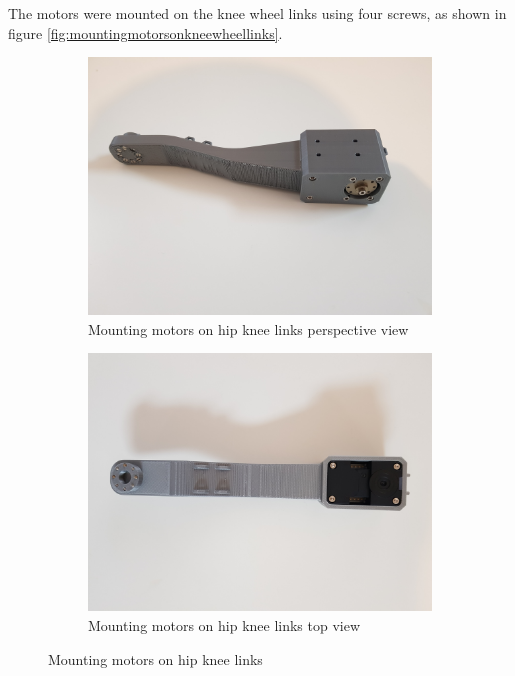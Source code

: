 The motors were mounted on the knee wheel links using four screws, as shown in figure \ref{fig:mountingmotorsonkneewheellinks}.
\begin{figure}[h]
	\centering
	\begin{subfigure}[t]{0.45\textwidth}
		\includegraphics[height=0.7\textwidth]{mounting_motors_on_hip_knee_links_1}
		\caption{Mounting motors on hip knee links perspective view}
		\label{fig:mountingmotorsonhipkneelinksperspectiveview}
	\end{subfigure}
	\begin{subfigure}[t]{0.45\textwidth}
		\includegraphics[height=0.7\textwidth]{mounting_motors_on_hip_knee_links_2}
		\caption{Mounting motors on hip knee links top view}
		\label{fig:mountingmotorsonhipkneelinkstopview}
	\end{subfigure}
	\caption{Mounting motors on hip knee links}
	\label{fig:Mounting motors on hip knee links}
\end{figure}
